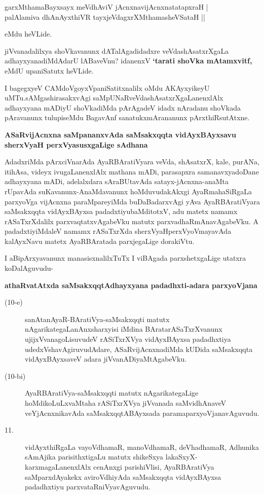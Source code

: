 \smallskip
\begin{shloka}
garxMthamaBayxsayx meVdhAviV jAcnxnavijAcnxnatatapxraH |\\\label{42}
palAlamiva dhAnAyxthiVR tayxjeVdagxrXMthamasheVSataH || 
\end{shloka}
eMdu heVLide.
\smallskip

jiVvanadalilxya shoVkavanunx dATalAgadidadxre veVdashAsatxrXgaLa adhayxyanadiMdA\-darU lABaveVnu? \-idanenxV {\bf `tarati shoVka mAtamxvitf,\label{42}} eMdU upaniSatutx heVLide.

I bagegxyeV CAMdoVgoyxVpaniSatitxnalilx oMdu AKAyxyikeyU uMTu.\break sAMgashirasakxvAgi saM\-pUNaR\-veVdashAsatxrXgaLanenxlAlx adhayxyana mADiyU shoVka\-diMda pArAgadeV idadx nAradanu shoVkada pAravanunx tulupiseMdu BagavAnf sanatukxmArananunx pArxthiRsutAtxne.

{\bigskip
\noindent
{\large\bf ASaRvijAcnxna saMpananxvAda saMsakxqqta vidAyxBAyxsavu sherxVyaH perxVyasusxgaLige sAdhana}}\label{page42}
\medskip

\noindent
AdadxriMda pArxciVnarAda AyaRBAratiVyara veVda, shAsatxrX, kale, purANa, itihAsa, videyx ivugaLa\-nenxlAlx mathana mADi, parasapxra samanavxyadoDane adhayxyana mADi, adelalxdara sAraBUtavAda satayx-jAcnxna\--anaMta rUpavAda suKavanunx-AnaMda\break\-vanunx hoMduvudakAkxgi AyaRmahaSiRgaLa parxyoVga vijAcnxna paraMpareyiMda buDaBadarxvAgi yAva AyaRBAratiVyara saMsakxqqta vidAyxBAyxsa \-padadxtiyu\break \hbox{baMditotxV}, adu matetx namamx rASaTxrXdalilx parxvaqtatxvAgabeVku matutx parxvadhaRmAna\-vAgabeVku. A padadxtiyiMdaleV namamx rASaTxrXda sherxVyaHperxVyoVmayavAda kalAyxNavu matetx AyaRBAratada parxjegaLige dorakiVtu.

I aBipArxyavanunx manasisxnalilxTuTx I viBAgada parxshetxgaLige utatxra koDalAgu\-vudu-

{\bigskip
\noindent
{\large\bf athaRvatAtxda saMsakxqqtAdhayxyana padadhxti-adara parxyoVjana}}\label{page4}

\begin{description}
\item[(10-e)] sanAtanAyaR-BAratiVya-saMsakxqqti matutx nAgarikategaLanAnxsharxyisi iMdina BArata\-rASaTxrX\-vanunx ujijxVvanagoLisuvudeV rASiTxrXVya vidAyxBAyxsa padadhxtiya udedxVshavAgiruvudAdare, ASaR\-vijAcnxna\-diMda kUDida saMsakxqqta vidAyxBAyxsaveV adara jiVvanADiyaMtAgabeVku.

\item[(10-bi)] AyaRBAratiVya-saMsakxqqti matutx nAgarikategaLige hoMdikoLuLx\-vaMtaha rASiTxrXVya jiVvanada saMvi\-dhAnaveV veYjAcnxnikavAda saMsakxqqtABAyxsada parama\-parxyoVjanavAguvudu. 

\item[11.] vidAyxthiRgaLa vayoVdhamaR, manoVdhamaR, deVhadhamaR, Adhunika sAmAjika parisithxtigaLu matutx shikeSxya lakaSxyX-karxmagaLanenxlAlx cenAnxgi parishiVlisi, AyaRBAratiVya saMparxdAyakekx avi\-roV\-dhi\-yAda saMsakxqqta vidAyxBAyxsa padadhxtiyu parxvataRniVyavAguvudu.
\end{description}

